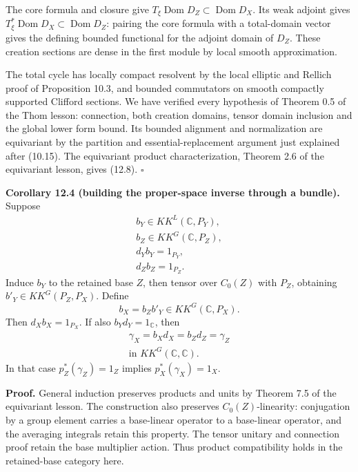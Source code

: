 \documentclass[
  11pt,
]{article}
\begin{document}
The core formula and closure give
\(T_\xi\operatorname{Dom}D_Z\subset\operatorname{Dom}D_X\). Its weak
adjoint gives
\(T_\xi^*\operatorname{Dom}D_X\subset\operatorname{Dom}D_Z\): pairing
the core formula with a total-domain vector gives the defining bounded
functional for the adjoint domain of \(D_Z\). These creation sections
are dense in the first module by local smooth approximation.

The total cycle has locally compact resolvent by the local elliptic and
Rellich proof of Proposition 10.3, and bounded commutators on smooth
compactly supported Clifford sections. We have verified every hypothesis
of Theorem 0.5 of the Thom lesson: connection, both creation domains,
tensor domain inclusion and the global lower form bound. Its bounded
alignment and normalization are equivariant by the partition and
essential-replacement argument just explained after (10.15). The
equivariant product characterization, Theorem 2.6 of the equivariant
lesson, gives (12.8). \(\square\)

\textbf{Corollary 12.4 (building the proper-space inverse through a
bundle).} Suppose \[
\begin{gathered}
b_Y\in KK^L(\mathbb C,P_Y),\\
b_Z\in KK^G(\mathbb C,P_Z),\\
d_Yb_Y=1_{P_Y},\\
d_Zb_Z=1_{P_Z}.
\end{gathered}
\tag{12.15}
\] Induce \(b_Y\) to the retained base \(Z\), then tensor over
\(C_0(Z)\) with \(P_Z\), obtaining \(b'_Y\in KK^G(P_Z,P_X)\). Define \[
b_X=b_Zb'_Y\in KK^G(\mathbb C,P_X).
\tag{12.16}
\] Then \(d_Xb_X=1_{P_X}\). If also \(b_Yd_Y=1_{\mathbb C}\), then \[
\begin{gathered}
\gamma_X=b_Xd_X=b_Zd_Z=\gamma_Z\\
\text{in }KK^G(\mathbb C,\mathbb C).
\end{gathered}
\tag{12.17}
\] In that case \(p_Z^*(\gamma_Z)=1_Z\) implies \(p_X^*(\gamma_X)=1_X\).

\textbf{Proof.} General induction preserves products and units by
Theorem 7.5 of the equivariant lesson. The construction also preserves
\(C_0(Z)\)-linearity: conjugation by a group element carries a
base-linear operator to a base-linear operator, and the averaging
integrals retain this property. The tensor unitary and connection proof
retain the base multiplier action. Thus product compatibility holds in
the retained-base category here.
\end{document}
